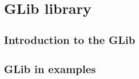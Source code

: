 
\section{GLib library}
\label{glib}

\subsection{Introduction to the GLib}

\subsection{GLib in examples}

